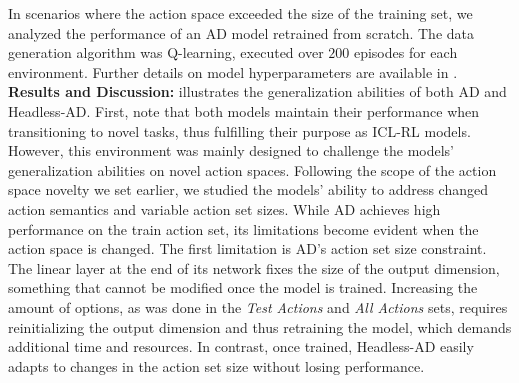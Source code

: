 \documentclass{article}
\theoremstyle{plain}
\theoremstyle{definition}
\theoremstyle{remark}
\begin{document}
In scenarios where the action space exceeded the size of the training set, we analyzed the performance of an AD model retrained from scratch. The data generation algorithm was Q-learning, executed over $200$ episodes for each environment. Further details on model hyperparameters are available in .
\textbf{Results and Discussion:}  illustrates the generalization abilities of both AD and Headless-AD. First, note that both models maintain their performance when transitioning to novel tasks, thus fulfilling their purpose as ICL-RL models. However, this environment was mainly designed to challenge the models' generalization abilities on novel action spaces. Following the scope of the action space novelty we set earlier, we studied the models' ability to address changed action semantics and variable action set sizes.
While AD achieves high performance on the train action set, its limitations become evident when the action space is changed. The first limitation is AD's action set size constraint. The linear layer at the end of its network fixes the size of the output dimension, something that cannot be modified once the model is trained. Increasing the amount of options, as was done in the \textit{Test Actions} and \textit{All Actions} sets, requires reinitializing the output dimension and thus retraining the model, which demands additional time and resources. In contrast, once trained, Headless-AD easily adapts to changes in the action set size without losing performance.
\end{document}
